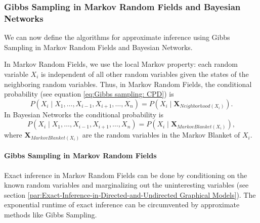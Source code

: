 \subsubsection{Gibbs Sampling in Markov Random Fields and Bayesian Networks \label{subsec:Inference-in-Markov-Random-Fields}}

We can now define the algorithms for approximate inference using Gibbs
Sampling in Markov Random Fields and Bayesian Networks.

In Markov Random Fields, we use the local Markov property: each random
variable $X_{i}$ is independent of all other random variables given
the states of the neighboring random variables. Thus, in Markov Random
Fields, the conditional probability (see equation \ref{eq:Gibbs sampling: CPD})
is 
\[
P(X_{i}\mid X_{1},\dots,X_{i-1},X_{i+1},\dots,X_{n})=P(X_{i}\mid\mathbf{X}_{Neighborhood(X_{i})}).
\]
In Bayesian Networks the conditional probability is 
\[
P(X_{i}\mid X_{1},\dots,X_{i-1},X_{i+1},\dots,X_{n})=P(X_{i}\mid\mathbf{X}_{MarkovBlanket(X_{i})}),
\]
where $\mathbf{X}_{MarkovBlanket(X_{i})}$ are the random variables
in the Markov Blanket of $X_{i}$.

\paragraph{Gibbs Sampling in Markov Random Fields\label{par:Gibbs-Sampling-in-Markov-Random-Fields}}

Exact inference in Markov Random Fields can be done by conditioning
on the known random variables and marginalizing out the uninteresting
variables (see section \ref{par:Exact-Inference-in-Directed-and-Undirected Graphical Models}).
The exponential runtime of exact inference can be circumvented by
approximate methods like Gibbs Sampling.

